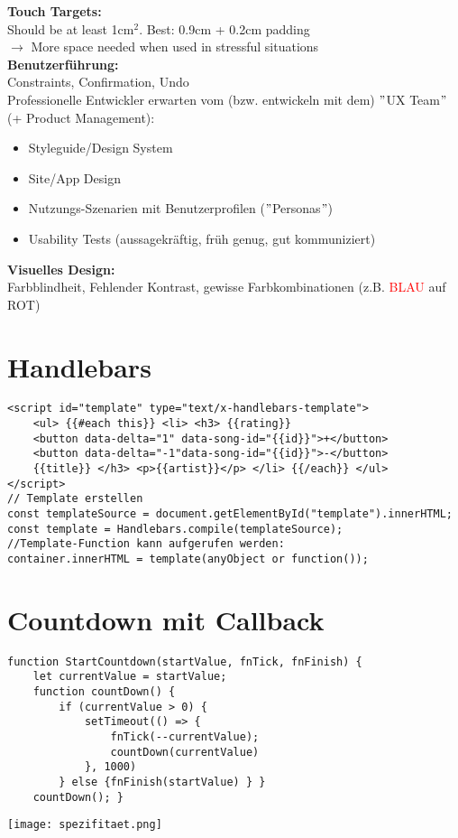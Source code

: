\documentclass[7pt,landscape,a4paper]{scrartcl}
\begin{document}
\begin{multicols*}{4}
	\textcolor{b}{\textbf{Touch Targets:}}\\
	Should be at least 1cm$^{2}$. Best: 0.9cm + 0.2cm padding\\
	$\rightarrow$ More space needed when used in stressful situations\\
	\textcolor{b}{\textbf{Benutzerführung:}}\\
	Constraints, Confirmation, Undo\\
	Professionelle Entwickler erwarten vom (bzw. entwickeln mit dem) $"$UX Team$"$ (+ Product Management):
	\begin{itemize}[topsep=0pt, leftmargin=3mm]
		\setlength\itemsep{-0.3em}
		\item Styleguide/Design System
		\item Site/App Design
		\item Nutzungs-Szenarien mit Benutzerprofilen ($"$Personas$"$)
		\item Usability Tests (aussagekräftig, früh genug, gut kommuniziert)
	\end{itemize}
	\textcolor{b}{\textbf{Visuelles Design:}}\\
	Farbblindheit, Fehlender Kontrast, gewisse Farbkombinationen (z.B. \textcolor{red}{BLAU} auf \textcolor{b}{ROT})
\section{Handlebars}
\begin{lstlisting}[style=htmlcssjs]
<script id="template" type="text/x-handlebars-template">
	<ul> {{#each this}} <li> <h3> {{rating}}
	<button data-delta="1" data-song-id="{{id}}">+</button>
	<button data-delta="-1"data-song-id="{{id}}">-</button>
	{{title}} </h3> <p>{{artist}}</p> </li> {{/each}} </ul>
</script>
// Template erstellen
const templateSource = document.getElementById("template").innerHTML;
const template = Handlebars.compile(templateSource);
//Template-Function kann aufgerufen werden:
container.innerHTML = template(anyObject or function());
\end{lstlisting}
\section{Countdown mit Callback}
\begin{lstlisting}[style=htmlcssjs]
function StartCountdown(startValue, fnTick, fnFinish) {
	let currentValue = startValue;
	function countDown() {
		if (currentValue > 0) {
			setTimeout(() => {
				fnTick(--currentValue);
				countDown(currentValue)
			}, 1000)
		} else {fnFinish(startValue) } }
	countDown(); }
\end{lstlisting}
\texttt{[image: spezifitaet.png]}
\end{multicols*}
\end{document}
